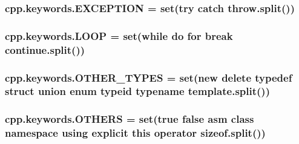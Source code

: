 \subsubsection[{\texorpdfstring{E\+X\+C\+E\+P\+T\+I\+ON}{EXCEPTION}}]{\setlength{\rightskip}{0pt plus 5cm}cpp.\+keywords.\+E\+X\+C\+E\+P\+T\+I\+ON = set(\textquotesingle{}try catch throw\textquotesingle{}.split())}\hypertarget{namespacecpp_1_1keywords_a2665fb8a25a4dae03fa5d3dc975c537c}{}\label{namespacecpp_1_1keywords_a2665fb8a25a4dae03fa5d3dc975c537c}
\subsubsection[{\texorpdfstring{L\+O\+OP}{LOOP}}]{\setlength{\rightskip}{0pt plus 5cm}cpp.\+keywords.\+L\+O\+OP = set(\textquotesingle{}while do for break continue\textquotesingle{}.split())}\hypertarget{namespacecpp_1_1keywords_af0164c05398a2291487b76414102d555}{}\label{namespacecpp_1_1keywords_af0164c05398a2291487b76414102d555}
\subsubsection[{\texorpdfstring{O\+T\+H\+E\+R\+\_\+\+T\+Y\+P\+ES}{OTHER_TYPES}}]{\setlength{\rightskip}{0pt plus 5cm}cpp.\+keywords.\+O\+T\+H\+E\+R\+\_\+\+T\+Y\+P\+ES = set(\textquotesingle{}new delete typedef struct union enum typeid typename template\textquotesingle{}.split())}\hypertarget{namespacecpp_1_1keywords_aa86a5e35a3ace14022a5ca1b91baf207}{}\label{namespacecpp_1_1keywords_aa86a5e35a3ace14022a5ca1b91baf207}
\subsubsection[{\texorpdfstring{O\+T\+H\+E\+RS}{OTHERS}}]{\setlength{\rightskip}{0pt plus 5cm}cpp.\+keywords.\+O\+T\+H\+E\+RS = set(\textquotesingle{}true false asm class namespace using explicit this operator sizeof\textquotesingle{}.split())}\hypertarget{namespacecpp_1_1keywords_a15fe231fbad145538b73892804898809}{}\label{namespacecpp_1_1keywords_a15fe231fbad145538b73892804898809}

